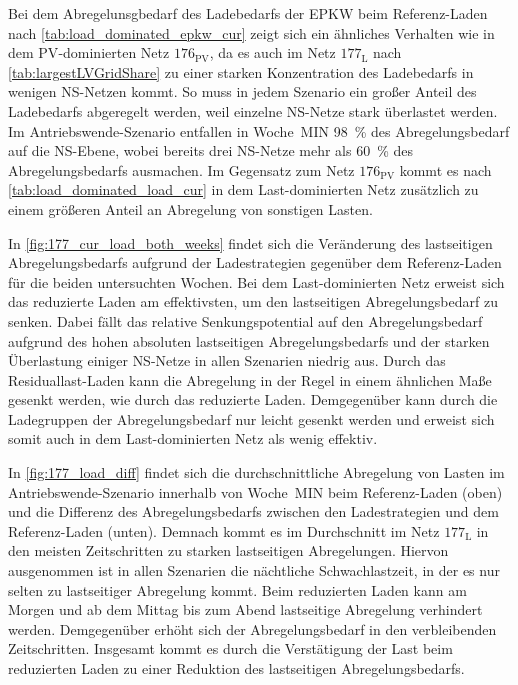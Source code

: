 



Bei dem Abregelunsgbedarf des Ladebedarfs der \gls{EPKW} beim Referenz-Laden nach \autoref{tab:load_dominated_epkw_cur} zeigt sich ein ähnliches Verhalten wie in dem \gls{PV}-dominierten Netz \(176_{\text{PV}}\), da es auch im Netz \(177_{\text{L}}\) nach \autoref{tab:largestLVGridShare} zu einer starken Konzentration des Ladebedarfs in wenigen \gls{NS}-Netzen kommt.
So muss in jedem Szenario ein großer Anteil des Ladebedarfs abgeregelt werden, weil einzelne \gls{NS}-Netze stark überlastet werden.
Im Antriebswende-Szenario entfallen in Woche~MIN \SI{98}{\percent} des Abregelungsbedarf auf die \gls{NS}-Ebene, wobei bereits drei \gls{NS}-Netze mehr als \SI{60}{\percent} des Abregelungsbedarfs ausmachen.
Im Gegensatz zum Netz \(176_{\text{PV}}\) kommt es nach \autoref{tab:load_dominated_load_cur} in dem Last-dominierten Netz zusätzlich zu einem größeren Anteil an Abregelung von sonstigen Lasten.





In \autoref{fig:177_cur_load_both_weeks} findet sich die Veränderung des lastseitigen Abregelungsbedarfs aufgrund der Ladestrategien gegenüber dem Referenz-Laden für die beiden untersuchten Wochen.
Bei dem Last-dominierten Netz erweist sich das reduzierte Laden am effektivsten, um den lastseitigen Abregelungsbedarf zu senken.
Dabei fällt das relative Senkungspotential auf den Abregelungsbedarf aufgrund des hohen absoluten lastseitigen Abregelungsbedarfs und der starken Überlastung einiger \gls{NS}-Netze in allen Szenarien niedrig aus.
Durch das Residuallast-Laden kann die Abregelung in der Regel in einem ähnlichen Maße gesenkt werden, wie durch das reduzierte Laden.
Demgegenüber kann durch die Ladegruppen der Abregelungsbedarf nur leicht gesenkt werden und erweist sich somit auch in dem Last-dominierten Netz als wenig effektiv.



In \autoref{fig:177_load_diff} findet sich die durchschnittliche Abregelung von Lasten im Antriebswende-Szenario innerhalb von Woche~MIN beim Referenz-Laden (oben) und die Differenz des Abregelungsbedarfs zwischen den Ladestrategien und dem Referenz-Laden (unten).
Demnach kommt es im Durchschnitt im Netz \(177_{\text{L}}\) in den meisten Zeitschritten zu starken lastseitigen Abregelungen.
Hiervon ausgenommen ist in allen Szenarien die nächtliche Schwachlastzeit, in der es nur selten zu lastseitiger Abregelung kommt.
Beim reduzierten Laden kann am Morgen und ab dem Mittag bis zum Abend lastseitige Abregelung verhindert werden.
Demgegenüber erhöht sich der Abregelungsbedarf in den verbleibenden Zeitschritten.
Insgesamt kommt es durch die Verstätigung der Last beim reduzierten Laden zu einer Reduktion des lastseitigen Abregelungsbedarfs.

